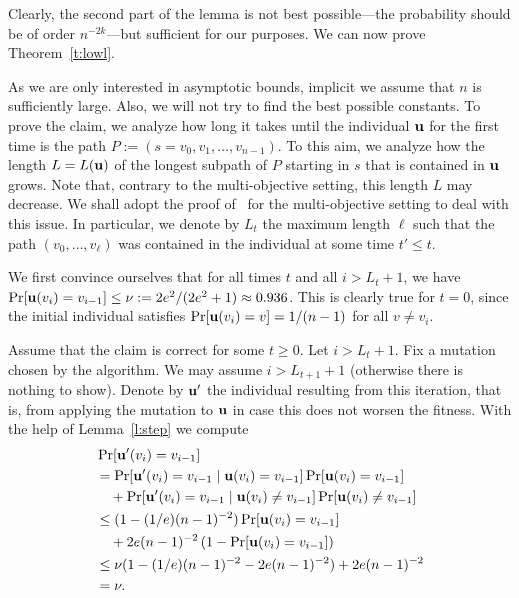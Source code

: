 \documentclass{sig-alternate}
\makeatletter
\newcommand{\NOTE}[1]{}
\newcommand{\NOTE}[1]{\marginpar{\setstretch{0.43}\textcolor{red}{\bf\tiny #1}}}
\newcommand{\tref}[1]{Theorem~\ref{#1}}
\newcommand{\lref}[1]{Lemma~\ref{#1}}
\DeclareRobustCommand{\qed}{\ifmmode\mathqed\else\leavevmode\unskip\penalty9999\hbox{}\nobreak\hfill\quad\hbox{\qedsymbol}\fi}
\let\QED@stack\@empty
\let\qed@elt\relax
\newcommand{\pushQED}[1]{\toks@{\qed@elt{#1}}\@temptokena\expandafter{\QED@stack}\xdef\QED@stack{\the\toks@\the\@temptokena}}
\newcommand{\popQED}{\begingroup\let\qed@elt\popQED@elt \QED@stack\relax\relax\endgroup}
\def\popQED@elt#1#2\relax{#1\gdef\QED@stack{#2}}
\newcommand{\mathqed}{\quad\hbox{\qedsymbol}}
\newcommand{\openbox}{\leavevmode\hbox to.77778em{\hfil\vrule\vbox to.675em{\hrule width.6em\vfil\hrule}\vrule\hfil}}
\providecommand{\qedsymbol}{\openbox}
\renewenvironment{proof}[1][\proofname]{\par\pushQED{\qed}\normalfont\topsep6\p@\@plus6\p@\relax\trivlist\item[\hskip\labelsep\itshape #1\@addpunct{.}]\ignorespaces}{\popQED\endtrivlist\@endpefalse}
\providecommand{\proofname}{Proof}
\makeatother
\begin{document}
Clearly, the second part of the lemma is not best possible---the probability
should be of order $n^{-2k}$---but sufficient for our purposes.
We can now prove \tref{t:lowl}.
\begin{proof}[Proof of \tref{t:lowl}]
  As we are only interested in asymptotic bounds, implicit we assume that $n$ is sufficiently
  large. Also, we will not try to find the best possible constants.
  To prove the claim, we analyze how long it takes until the individual $\mathbf{u}$ for 
  the first time is the path $P:=(s=v_0,v_1,\ldots,v_{n-1})$. To this aim, 
  we analyze how the length $L = L(\mathbf{u})$ of the longest subpath of $P$ starting 
  in $s$ that is contained in $\mathbf{u}$ grows. Note that, contrary to the
  multi-objective setting, this length $L$ may decrease. We shall adopt the proof of~\cite{ssspcec07} for 
  the multi-objective setting to deal with this issue. In particular, we denote 
  by $L_t$ the maximum length $\ell$ such that the path $(v_0, \ldots, v_\ell)$ 
  was contained in the individual at some time $t' \le t$. 
  
  We first convince ourselves that for all times $t$ and all $i > L_t+1$, we have 
  $\Pr[\mathbf{u}(v_i) = v_{i-1}] \le \nu := 2e^2/(2e^2 + 1) \approx 0.936$. This is clearly true for $t = 0$, since the 
  initial individual satisfies $\Pr[\mathbf{u}(v_i) = v] = 1 /(n-1)$ for all $v \neq v_i$. 
  
  Assume that the claim is correct for some $t \ge 0$. Let $i > L_t+1$. Fix a 
  mutation chosen by the algorithm. We may assume $i > L_{t+1}+1$ (otherwise 
  there is nothing to show). Denote by $\mathbf{u}'$ the individual resulting from 
  this iteration, that is, from applying the mutation to $\mathbf{u}$ in case this does 
  not worsen the fitness. With the help of \lref{l:step} we compute
  \begin{align*}
  &\Pr[\mathbf{u}'(v_i) = v_{i-1}]\\
  &= \Pr[\mathbf{u}'(v_i) = v_{i-1} \mid \mathbf{u}(v_i)=v_{i-1}]\Pr[\mathbf{u}(v_i)=v_{i-1}] \\
  &\quad + \Pr[\mathbf{u}'(v_i) = v_{i-1} \mid \mathbf{u}(v_i) \neq v_{i-1}]\Pr[\mathbf{u}(v_i) \neq v_{i-1}]\\
  &\le (1 - (1/e)(n-1)^{-2}) \Pr[\mathbf{u}(v_i)=v_{i-1}] \\
  &\quad + 2e (n-1)^{-2}\, (1 - \Pr[\mathbf{u}(v_i)=v_{i-1}]) \\
  &\le \nu (1 - (1/e)(n-1)^{-2} - 2e (n-1)^{-2}) + 2e (n-1)^{-2}\\
  &= \nu.
  \end{align*}
  

\end{proof}
\end{document}
